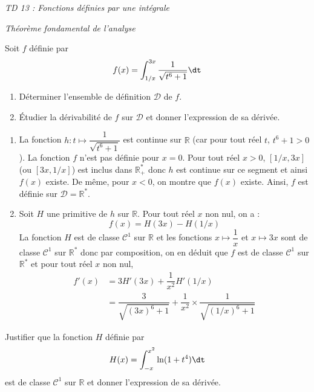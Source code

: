 \documentclass[a4paper,10pt]{report}
\begin{document}
\everymath{\displaystyle}

\begin{center}
\textit{{ {\huge TD 13 : Fonctions définies par une intégrale}}}
\end{center}


\bigskip

\begin{center}
\textit{{ {\large Théorème fondamental de l'analyse}}}
\end{center}

\medskip

\begin{Exercice}{} Soit $f$ définie par 
$$f(x) = \int_{1/x}^{3x}\frac{1}{\sqrt{t^6+1}}\dt$$ 
\begin{enumerate}
\item Déterminer l'ensemble de définition $\mathcal{D}$ de $f$.
\item Étudier la dérivabilité de $f$ sur $\mathcal{D}$ et donner l'expression de sa dérivée.
\end{enumerate}
\end{Exercice} 

\corr 

\begin{enumerate}
\item La fonction $h : t \mapsto \dfrac{1}{\sqrt{t^6+1}}$ est continue sur $\mathbb{R}$ (car pour tout réel $t$, $t^6+1>0$). La fonction $f$ n'est pas définie pour $x=0$. Pour tout réel $x>0$, $[1/x,3x]$ (ou $[3x, 1/x]$) est inclus dans $\mathbb{R}_+^*$ donc $h$ est continue sur ce segment et ainsi $f(x)$ existe.  De même, pour $x<0$, on montre que $f(x)$ existe. Ainsi, $f$ est définie sur $\mathcal{D} = \mathbb{R}^*$.
\item Soit $H$ une primitive de $h$ sur $\mathbb{R}$. Pour tout réel $x$ non nul, on a :
$$ f(x) = H(3x)-H(1/x)$$
La fonction $H$ est de classe $\mathcal{C}^1$ sur $\mathbb{R}$ et les fonctions $x \mapsto \dfrac{1}{x}$ et $x \mapsto 3x$ sont de classe $\mathcal{C}^1$ sur $\mathbb{R}^*$ donc par composition, on en déduit que $f$ est de classe $\mathcal{C}^1$ sur $\mathbb{R}^*$ et pour tout réel $x$ non nul,
\begin{align*}
f'(x) & = 3 H'(3x)  + \dfrac{1}{x^2} H'(1/x) \\
& = \dfrac{3}{\sqrt{(3x)^6+1}} + \dfrac{1}{x^2} \times \dfrac{1}{\sqrt{(1/x)^6+1}} 
\end{align*}
\end{enumerate}

\begin{Exercice}{} Justifier que la fonction $H$ définie par 
$$H(x) = \int_{-x}^{x^2} \ln(1+t^4) \dt$$
est de classe $\mathcal{C}^1$ sur $\mathbb{R}$ et donner l'expression de sa dérivée.
\end{Exercice}
\end{document}
